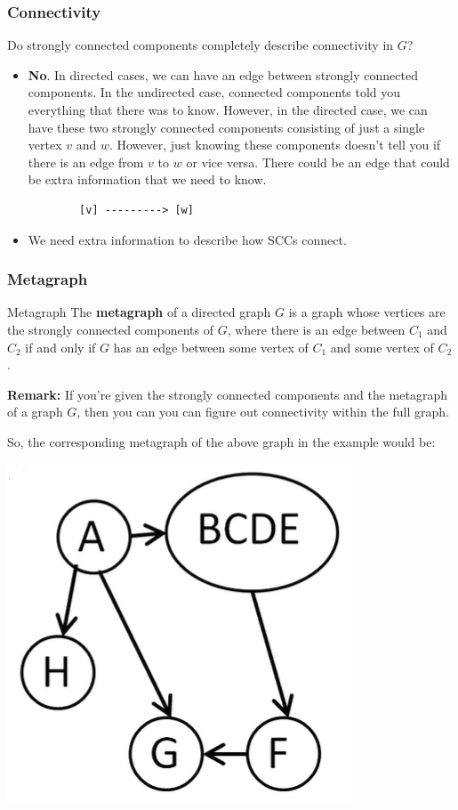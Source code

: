 \documentclass[letterpaper]{article}
\begin{document}
\subsubsection{Connectivity}
Do strongly connected components completely describe connectivity in $G$?
\begin{itemize}
    \item \textbf{No}. In directed cases, we can have an edge between strongly connected components. In the undirected case, connected components told you everything that there was to know. However, in the directed case, we can have these two strongly connected components consisting of just a single vertex $v$ and $w$. However, just knowing these components doesn't tell you if there is an edge from $v$ to $w$ or vice versa. There could be an edge that could be extra information that we need to know. 
    \begin{verbatim}
        [v] ---------> [w]
    \end{verbatim}

    \item We need extra information to describe how SCCs connect. 
\end{itemize}

\subsubsection{Metagraph}
\begin{definition}{Metagraph}{}
    The \textbf{metagraph} of a directed graph $G$ is a graph whose vertices are the strongly connected components of $G$, where there is an edge between $C_1$ and $C_2$ if and only if $G$ has an edge between some vertex of $C_1$ and some vertex of $C_2$. 
\end{definition}
\textbf{Remark:} If you're given the strongly connected components and the metagraph of a graph $G$, then you can you can figure out connectivity within the full graph.

\bigskip

So, the corresponding metagraph of the above graph in the example would be: 
\begin{center}
    \includegraphics[scale=0.6]{assets/scc_meta.png}
\end{center}
\end{document}
